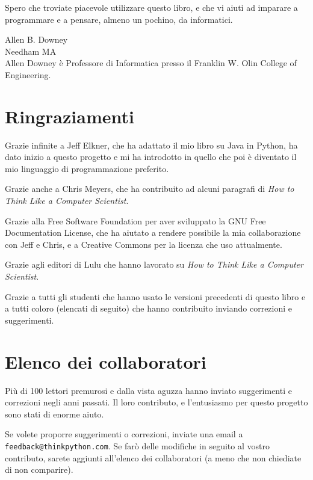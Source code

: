 \documentclass[10pt]{book}
\begin{document}
Spero che troviate piacevole utilizzare questo libro, e che vi aiuti ad imparare a programmare e a pensare, almeno un pochino, da informatici.


Allen B. Downey \\
Needham MA\\

Allen Downey è Professore di Informatica presso il Franklin W. Olin College of Engineering.


\section*{Ringraziamenti}

Grazie infinite a Jeff Elkner, che ha adattato il mio libro su Java in Python, ha dato inizio a questo progetto e mi ha introdotto in quello che poi è diventato il mio linguaggio di programmazione preferito. 

Grazie anche a Chris Meyers, che ha contribuito ad alcuni paragrafi di
{\em How to Think Like a Computer Scientist}.

Grazie alla Free Software Foundation per aver sviluppato la GNU Free Documentation License, che ha aiutato a rendere possibile la mia collaborazione con Jeff e Chris, e a Creative Commons per la licenza che uso attualmente.

Grazie agli editori di Lulu che hanno lavorato su
{\em How to Think Like a Computer Scientist}.

Grazie a tutti gli studenti che hanno usato le versioni precedenti di questo libro e a tutti coloro (elencati di seguito) che hanno contribuito inviando correzioni e suggerimenti.


\section*{Elenco dei collaboratori}

Più di 100 lettori premurosi e dalla vista aguzza hanno inviato suggerimenti e correzioni negli anni passati. Il loro contributo, e l'entusiasmo per questo progetto sono stati di enorme aiuto.

Se volete proporre suggerimenti o correzioni, inviate una email a 
{\tt feedback@thinkpython.com}. Se farò delle modifiche in seguito al vostro contributo, sarete aggiunti all'elenco dei collaboratori (a meno che non chiediate di non comparire).
\end{document}
